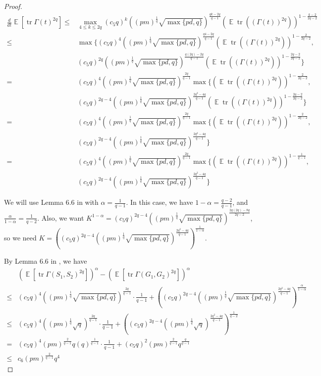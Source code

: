 \documentclass[11pt]{amsart}
\numberwithin{equation}{section}
\numberwithin{equation}{section}
\DeclareMathOperator{\E}{\mathbb{E}}
\DeclareMathOperator*{\tr}{tr}
\theoremstyle{remark}
\theoremstyle{definition}
\begin{document}
\begin{proof}
\begin{align*}
\frac{d}{dt} \E[\tr \Gamma(t)^{2q}] \le&\max \limits_{4 \le k \le 2q} (c_5q)^k ((pm)^{\frac{1}{q}}\sqrt{\max\{pd,q\}})^{\frac{qk-2q}{q-1}}(\E \tr((\Gamma(t))^{2q}))^{1-\frac{k-2}{2q-2}}\\ \le & \max \{(c_5q)^4 ((pm)^{\frac{1}{q}}\sqrt{\max\{pd,q\}})^{\frac{q4-2q}{q-1}}(\E \tr((\Gamma(t))^{2q}))^{1-\frac{2}{2q-2}}, \\& (c_5q)^{2q} ((pm)^{\frac{1}{q}}\sqrt{\max\{pd,q\}})^{\frac{q(2q)-2q}{q-1}}(\E \tr((\Gamma(t))^{2q}))^{1-\frac{2q-2}{2q-2}}\}
\\ = & (c_5q)^4 ((pm)^{\frac{1}{q}}\sqrt{\max\{pd,q\}})^{\frac{2q}{q-1}} \max \{(\E \tr((\Gamma(t))^{2q}))^{1-\frac{2}{2q-2}}, \\& (c_5q)^{2q-4} ((pm)^{\frac{1}{q}}\sqrt{\max\{pd,q\}})^{\frac{2q^2-4q}{q-1}}(\E \tr((\Gamma(t))^{2q}))^{1-\frac{2q-2}{2q-2}}\}
\\ = & (c_5q)^4 ((pm)^{\frac{1}{q}}\sqrt{\max\{pd,q\}})^{\frac{2q}{q-1}} \max \{(\E \tr((\Gamma(t))^{2q}))^{1-\frac{2}{2q-2}}, \\& (c_5q)^{2q-4} ((pm)^{\frac{1}{q}}\sqrt{\max\{pd,q\}})^{\frac{2q^2-4q}{q-1}}\}
\\ = & (c_5q)^4 ((pm)^{\frac{1}{q}}\sqrt{\max\{pd,q\}})^{\frac{2q}{q-1}} \max \{(\E \tr((\Gamma(t))^{2q}))^{1-\frac{1}{q-1}}, \\& (c_5q)^{2q-4} ((pm)^{\frac{1}{q}}\sqrt{\max\{pd,q\}})^{\frac{2q^2-4q}{q-1}}\}
\end{align*}






We will use Lemma 6.6 in \cite{brailovskaya2022universality} with $\alpha=\frac{1}{q-1}$. In this case, we have ${1-\alpha}={\frac{q-2}{q-1}}$, and $\frac{\alpha}{1-\alpha}=\frac{1}{q-2}$. Also, we want $K^{1-\alpha}=(c_5q)^{2q-4} ((pm)^{\frac{1}{q}}\sqrt{\max\{pd,q\}})^{\frac{2q(2q)-8q}{2q-2}}$, so we need $K=((c_5q)^{2q-4} ((pm)^{\frac{1}{q}}\sqrt{\max\{pd,q\}})^{\frac{2q^2-4q}{q-1}})^{\frac{1}{1-\alpha}}$.

By Lemma 6.6 in \cite{brailovskaya2022universality}, we have
\begin{align*}
    &(\E[\tr \Gamma(S_1,S_2)^{2q}])^{\alpha}-(\E[\tr \Gamma(G_1,G_2)^{2q}])^{\alpha} \\\le& (c_5q)^4 ((pm)^{\frac{1}{q}}\sqrt{\max\{pd,q\}})^{\frac{2q}{q-1}} \cdot \frac{1}{q-1}+ ((c_5q)^{2q-4} ((pm)^{\frac{1}{q}}\sqrt{\max\{pd,q\}})^{\frac{2q^2-4q}{q-1}})^{\frac{\alpha}{1-\alpha}}
    \\\le& (c_5q)^4 ((pm)^{\frac{1}{q}}\sqrt{q})^{\frac{2q}{q-1}} \cdot \frac{1}{q-1}+ ((c_5q)^{2q-4} ((pm)^{\frac{1}{q}}\sqrt{q})^{\frac{2q^2-4q}{q-1}})^{\frac{1}{q-2}}
    \\=& (c_5q)^4 (pm)^{\frac{2}{q-1}} q (q)^{\frac{1}{q-1}} \cdot \frac{1}{q-1}+ (c_5q)^{2} (pm)^{\frac{2}{q-1}} q^\frac{q}{q-1}
    \\ \le & c_6 (pm)^{\frac{2}{q-1}} q^4
\end{align*}


\end{proof}
\end{document}
